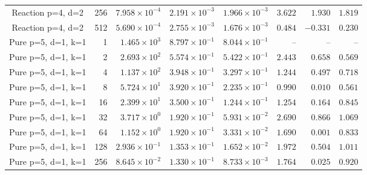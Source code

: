 \begin{longtable}{@{}crrrrrrr@{}}
Reaction p=4, d=2 & 256 & $7.958\!\times\!10^{-4}$ & $2.191\!\times\!10^{-3}$ & $1.966\!\times\!10^{-3}$ & $3.622$ & $1.930$ & $1.819$ \\
Reaction p=4, d=2 & 512 & $5.690\!\times\!10^{-4}$ & $2.755\!\times\!10^{-3}$ & $1.676\!\times\!10^{-3}$ & $0.484$ & $-0.331$ & $0.230$ \\
Pure p=5, d=1, k=1 & 1 & $1.465\!\times\!10^{3}$ & $8.797\!\times\!10^{-1}$ & $8.044\!\times\!10^{-1}$ & -- & -- & -- \\
Pure p=5, d=1, k=1 & 2 & $2.693\!\times\!10^{2}$ & $5.574\!\times\!10^{-1}$ & $5.422\!\times\!10^{-1}$ & $2.443$ & $0.658$ & $0.569$ \\
Pure p=5, d=1, k=1 & 4 & $1.137\!\times\!10^{2}$ & $3.948\!\times\!10^{-1}$ & $3.297\!\times\!10^{-1}$ & $1.244$ & $0.497$ & $0.718$ \\
Pure p=5, d=1, k=1 & 8 & $5.724\!\times\!10^{1}$ & $3.920\!\times\!10^{-1}$ & $2.235\!\times\!10^{-1}$ & $0.990$ & $0.010$ & $0.561$ \\
Pure p=5, d=1, k=1 & 16 & $2.399\!\times\!10^{1}$ & $3.500\!\times\!10^{-1}$ & $1.244\!\times\!10^{-1}$ & $1.254$ & $0.164$ & $0.845$ \\
Pure p=5, d=1, k=1 & 32 & $3.717\!\times\!10^{0}$ & $1.920\!\times\!10^{-1}$ & $5.931\!\times\!10^{-2}$ & $2.690$ & $0.866$ & $1.069$ \\
Pure p=5, d=1, k=1 & 64 & $1.152\!\times\!10^{0}$ & $1.920\!\times\!10^{-1}$ & $3.331\!\times\!10^{-2}$ & $1.690$ & $0.001$ & $0.833$ \\
Pure p=5, d=1, k=1 & 128 & $2.936\!\times\!10^{-1}$ & $1.353\!\times\!10^{-1}$ & $1.652\!\times\!10^{-2}$ & $1.972$ & $0.504$ & $1.011$ \\
Pure p=5, d=1, k=1 & 256 & $8.645\!\times\!10^{-2}$ & $1.330\!\times\!10^{-1}$ & $8.733\!\times\!10^{-3}$ & $1.764$ & $0.025$ & $0.920$ \\
\bottomrule
\end{longtable}
